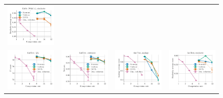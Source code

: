 \begin{figure}
\begin{tabular}{@{\hskip -0.0in}c@{\hskip -0.0in}c@{\hskip -0.0in}c@{\hskip -0.0in}c@{\hskip -0.0in}}
		\includegraphics[width=.245\linewidth]{figures/glove400k_intrinsics_similarity-avg-score_vs_compression_linx_det.pdf} \\
		\includegraphics[width=.245\linewidth]{figures/fasttext1m_qa_best-f1_vs_compression_linx_det.pdf} &
		\includegraphics[width=.245\linewidth]{figures/fasttext1m_sentiment_sst_test-acc_vs_compression_linx_det.pdf} &
		\includegraphics[width=.245\linewidth]{figures/fasttext1m_intrinsics_analogy-avg-score_vs_compression_linx_det.pdf} &
		\includegraphics[width=.245\linewidth]{figures/fasttext1m_intrinsics_similarity-avg-score_vs_compression_linx_det.pdf} \\


\end{tabular}
\end{figure}
